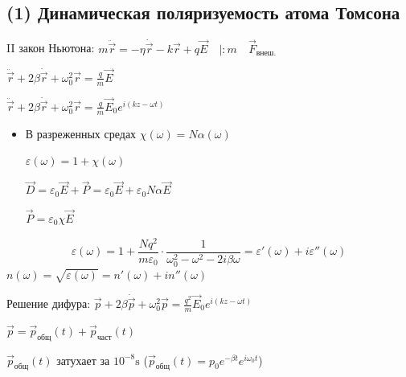 \subsection{(1) Динамическая поляризуемость атома Томсона}

\begin{figure}[H]
	\centering
\end{figure}

II закон Ньютона: $m\ddot{\vec{r}} = -\eta\dot{\vec{r}} - k\vec{r} + q\vec{E} \quad \big| : m \quad \vec{F}_{\text{внеш.}}$

$\ddot{\vec{r}} + 2\beta\dot{\vec{r}} + \omega_0^2\vec{r} = \frac{q}{m}\vec{E}$

$\ddot{\vec{r}} + 2\beta\dot{\vec{r}} + \omega_0^2\vec{r} = \frac{q}{m}\vec{E}_0 e^{i(kz - \omega t)}$

\begin{itemize}
	\item В разреженных средах $\chi(\omega) = N\alpha(\omega)$
	
	$\varepsilon(\omega) = 1 + \chi(\omega)$
	
	$\vec{D} = \varepsilon_0 \vec{E} + \vec{P} = \varepsilon_0 \vec{E} + \varepsilon_0 N\alpha \vec{E}$
	
	$\vec{P} = \varepsilon_0 \chi \vec{E}$
\end{itemize}

\begin{equation}
	\varepsilon(\omega) = 1 + \frac{N q^2}{m\varepsilon_0} \cdot \frac{1}{\omega_0^2 - \omega^2 - 2i\beta\omega} = \varepsilon'(\omega) + i\varepsilon''(\omega)
\end{equation}
$n(\omega) = \sqrt{\varepsilon(\omega)} = n'(\omega) + i n''(\omega)$

Решение дифура: $\vec{p} + 2\beta\dot{\vec{p}} + \omega_0^2\vec{p} = \frac{q^2}{m}\vec{E}_0 e^{i(kz - \omega t)}$

$\vec{p} = \vec{p}_{\text{общ}}(t) + \vec{p}_{\text{част}}(t)$

$\vec{p}_{\text{общ}}(t)$ затухает за $10^{-8} \si{\second}$ ($\vec{p}_{\text{общ}}(t) = p_0 e^{-\beta t} e^{i\omega_0 t}$)


